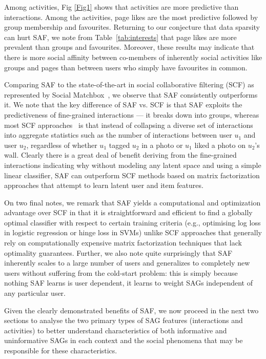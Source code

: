 Among activities, Fig \ref{Fig1} shows that activities are more
predictive than interactions. Among the activities, page likes are the
most predictive followed by group membership and favourites.
Returning to our conjecture that data sparsity can hurt SAF, we note
from Table~\ref{tab:interests} that page likes are more prevalent than
groups and favourites.  Moreover, these results may indicate that
there is more social affinity between co-members of inherently social
activities like groups and pages than between users who simply have
favourites in common.

Comparing SAF to the state-of-the-art in social
collaborative filtering (SCF) as represented by Social
Matchbox~\cite{Noel2012NOF}, we observe that SAF consistently
outperforms it.  We note that the key difference of SAF vs. SCF is
that SAF exploits the predictiveness of fine-grained interactions ---
it breaks down into groups, whereas most SCF
approaches~\cite{Noel2012NOF,lla,socinf,sr,rrmf,sorec,ste} is that
instead of collapsing a diverse set of interactions into aggregate
statistics such as the number of interactions between user $u_1$ and
user $u_2$, regardless of whether $u_1$ tagged $u_2$ in a photo or
$u_1$ liked a photo on $u_2$'s wall.  Clearly there is a great deal of
benefit deriving from the fine-grained interactions indicating why
without modeling any latent space and using a simple linear
classifier, SAF can outperform SCF methods based on matrix
factorization approaches that attempt to learn latent user and item
features.

On two final notes, we remark that SAF yields a computational and
optimization advantage over SCF in that it is straightforward and
efficient to find a globally optimal classifier with respect to certain training
criteria (e.g., optimising log loss in logistic regression or hinge
loss in SVMs) unlike SCF approaches that generally rely on
computationally expensive matrix factorization techniques that lack
optimality guarantees.  Further, we also note quite surprisingly that
SAF inherently scales to a large number of users and generalizes to
completely new users without suffering from the cold-start problem:
this is simply because nothing SAF learns is user dependent, it learns
to weight SAGs independent of any particular user.

Given the clearly demonstrated benefits of SAF, we now proceed in the
next two sections to analyse the two primary types of SAG features
(interactions and activities) to better understand characteristics of
both informative and uninformative SAGs in each context and the social
phenomena that may be responsible for these characteristics.
